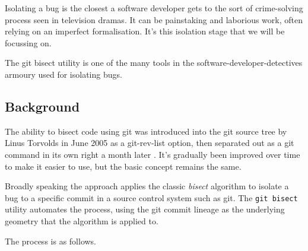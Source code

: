 \documentclass[10pt,journal,compsoc]{IEEEtran}
\begin{document}
Isolating a bug is the closest a software developer gets to the sort of crime-solving process seen in television dramas. It can be painstaking and laborious work, often relying on an imperfect formalisation. It's this isolation stage that we will be focussing on.

The {\code git bisect} utility is one of the many tools in the software-developer-detectives armoury used for isolating bugs.

\subsection{Background}

The ability to bisect code using {\code git} was introduced into the {\code git} source tree by Linus Torvolds in June 2005 \cite{git-commit-8b3a1e056f21} as a {\code git-rev-list} option, then separated out as a {\code git} command in its own right a month later \cite{git-commit-8cc6a0831988}. It's gradually been improved over time to make it easier to use, but the basic concept remains the same.

Broadly speaking the approach applies the classic {\it bisect\/} algorithm to isolate a bug to a specific commit in a source control system such as git. The {\tt git bisect} utility automates the process, using the git commit lineage as the underlying geometry that the algorithm is applied to.

The process is as follows.
\end{document}
